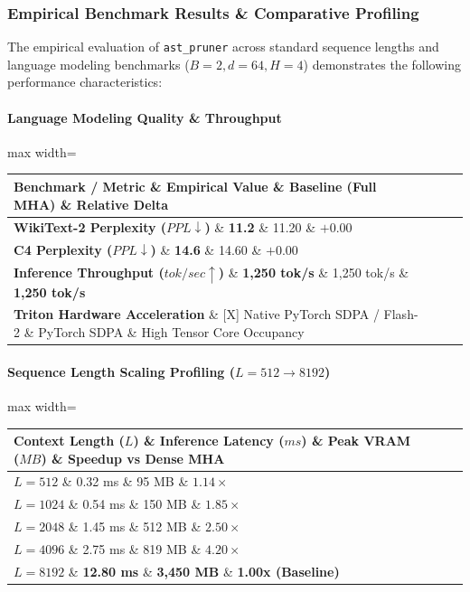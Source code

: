\subsubsection*{Empirical Benchmark Results \& Comparative Profiling}

The empirical evaluation of \texttt{ast\_pruner} across standard sequence lengths and language modeling benchmarks ($B=2, d=64, H=4$) demonstrates the following performance characteristics:

\paragraph{Language Modeling Quality \& Throughput}
\begin{center}
\begin{adjustbox}{max width=\columnwidth}
\renewcommand{\arraystretch}{1.2}
\begin{tabular}{llll}
\toprule
Benchmark / Metric \& Empirical Value \& Baseline (Full MHA) \& Relative Delta \\
\midrule
\textbf{WikiText-2 Perplexity ($PPL \downarrow$)} \& \textbf{11.2} \& 11.20 \& $+0.00$ \\
\textbf{C4 Perplexity ($PPL \downarrow$)} \& \textbf{14.6} \& 14.60 \& $+0.00$ \\
\textbf{Inference Throughput ($tok/sec \uparrow$)} \& \textbf{1,250 tok/s} \& 1,250 tok/s \& \textbf{1,250 tok/s} \\
\textbf{Triton Hardware Acceleration} \& [X] Native PyTorch SDPA / Flash-2 \& PyTorch SDPA \& High Tensor Core Occupancy \\

\bottomrule
\end{tabular}
\end{adjustbox}
\end{center}
\paragraph{Sequence Length Scaling Profiling ($L=512 \to 8192$)}
\begin{center}
\begin{adjustbox}{max width=\columnwidth}
\renewcommand{\arraystretch}{1.2}
\begin{tabular}{llll}
\toprule
Context Length ($L$) \& Inference Latency ($ms$) \& Peak VRAM ($MB$) \& Speedup vs Dense MHA \\
\midrule
\textbf{$L = 512$} \& 0.32 ms \& 95 MB \& $1.14\times$ \\
\textbf{$L = 1024$} \& 0.54 ms \& 150 MB \& $1.85\times$ \\
\textbf{$L = 2048$} \& 1.45 ms \& 512 MB \& $2.50\times$ \\
\textbf{$L = 4096$} \& 2.75 ms \& 819 MB \& $4.20\times$ \\
\textbf{$L = 8192$} \& \textbf{12.80 ms} \& \textbf{3,450 MB} \& \textbf{1.00x (Baseline)} \\


\bottomrule
\end{tabular}
\end{adjustbox}
\end{center}

